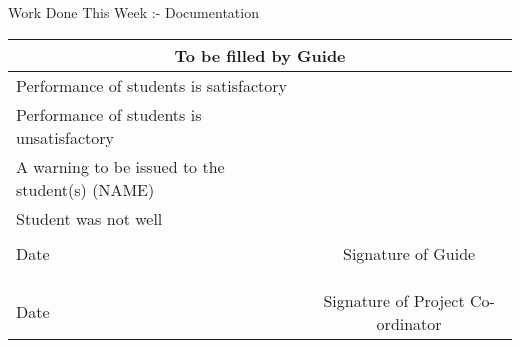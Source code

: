 \documentclass[14pt]{extarticle}
\begin{document}
Work Done This Week :- Documentation


\begin{center}
    
    \begin{tabular}{|l|c|}
        \hline
        \multicolumn{2}{|c|}{To be filled by Guide} \\    
        \hline
        Performance of students is satisfactory & \\
        \hline
        Performance of students is unsatisfactory & \\
        \hline
        A warning to be issued to the student(s) (NAME) & \\
        \hline
        Student was not well & \\
        \hline
        \multicolumn{1}{|l}{} & \multicolumn{1}{c|}{} \\
        \multicolumn{1}{|l}{Date} & \multicolumn{1}{c|}{Signature of Guide} \\
        \hline
        \multicolumn{1}{l}{} & \multicolumn{1}{c}{} \\
        \multicolumn{1}{l}{} & \multicolumn{1}{c}{} \\
        \multicolumn{1}{l}{} & \multicolumn{1}{c}{} \\
        \multicolumn{1}{l}{Date} & \multicolumn{1}{c}{Signature of Project Co-ordinator} \\
    \end{tabular}
\end{center}
\end{document}
